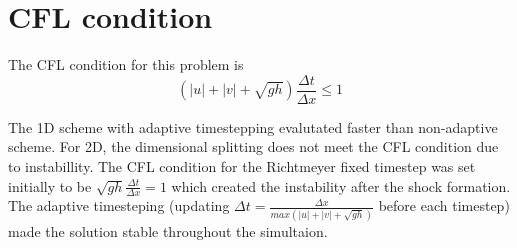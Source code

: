 \section{CFL condition}
The CFL condition for this problem is 
\[(|u|+|v|+\sqrt{gh})\frac{\Delta t}{\Delta x} \le 1\]

The 1D scheme with adaptive timestepping evalutated faster than non-adaptive scheme. For 2D, the dimensional splitting does not meet the CFL condition due to instabillity.
The CFL condition for the Richtmeyer fixed timestep was set initially to be $\sqrt{gh}\frac{\Delta t}{\Delta x} = 1$ which created the instability after the shock 
formation. The adaptive timesteping (updating $\Delta t = \frac{\Delta x}{max(|u|+|v|+\sqrt{gh})}$  before each timestep) made the solution stable throughout the simultaion.  